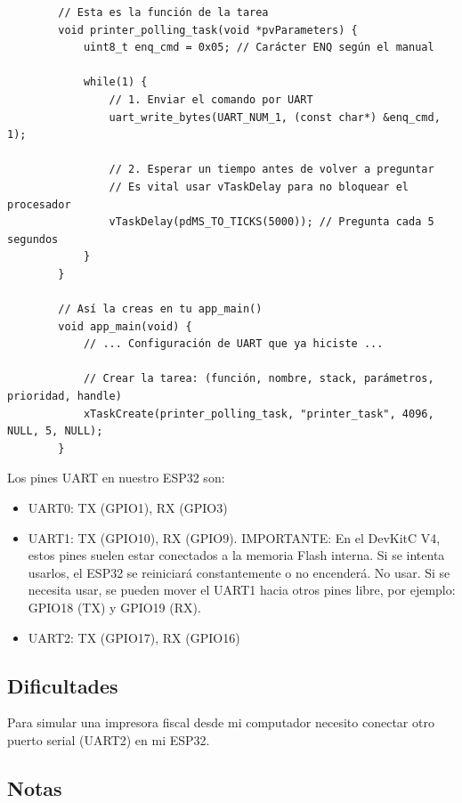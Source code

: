 \documentclass[12pt, a4paper]{article}
\begin{document}
    \begin{verbatim}
        // Esta es la función de la tarea
        void printer_polling_task(void *pvParameters) {
            uint8_t enq_cmd = 0x05; // Carácter ENQ según el manual
            
            while(1) {
                // 1. Enviar el comando por UART
                uart_write_bytes(UART_NUM_1, (const char*) &enq_cmd, 1);
                
                // 2. Esperar un tiempo antes de volver a preguntar
                // Es vital usar vTaskDelay para no bloquear el procesador
                vTaskDelay(pdMS_TO_TICKS(5000)); // Pregunta cada 5 segundos
            }
        }
        
        // Así la creas en tu app_main()
        void app_main(void) {
            // ... Configuración de UART que ya hiciste ...
        
            // Crear la tarea: (función, nombre, stack, parámetros, prioridad, handle)
            xTaskCreate(printer_polling_task, "printer_task", 4096, NULL, 5, NULL);
        }
    \end{verbatim}

    Los pines UART en nuestro ESP32 son:
    
    \begin{itemize}
        \item UART0: TX (GPIO1), RX (GPIO3)
        \item UART1: TX (GPIO10), RX (GPIO9). IMPORTANTE: En el DevKitC V4, estos pines suelen estar conectados a la memoria Flash interna. Si se intenta usarlos, el ESP32 se reiniciará constantemente o no encenderá. No usar. Si se necesita usar, se pueden mover el UART1 hacia otros pines libre, por ejemplo: GPIO18 (TX) y GPIO19 (RX).
        \item UART2: TX (GPIO17), RX (GPIO16)
    \end{itemize} 

    \subsection*{Dificultades}

    Para simular una impresora fiscal desde mi computador necesito conectar otro puerto serial (UART2) en mi ESP32.

    \subsection*{Notas}
\end{document}

